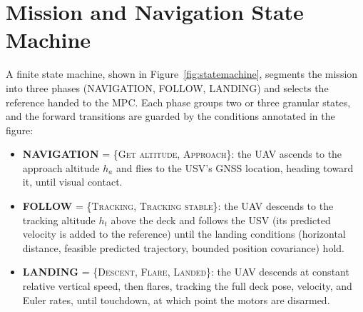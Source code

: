 \documentclass[12pt,a4paper]{report}
\begin{document}
\section{Mission and Navigation State Machine}
A finite state machine, shown in Figure~\ref{fig:statemachine}, segments the mission into three phases (NAVIGATION, FOLLOW, LANDING) and selects the reference handed to the MPC. Each phase groups two or three granular states, and the forward transitions are guarded by the conditions annotated in the figure:

\begin{itemize}[itemsep=2pt]
    \item \textbf{NAVIGATION} = \{\textsc{Get altitude}, \textsc{Approach}\}: the UAV ascends to the approach altitude $h_a$ and flies to the USV's GNSS location, heading toward it, until visual contact.
    \item \textbf{FOLLOW} = \{\textsc{Tracking}, \textsc{Tracking stable}\}: the UAV descends to the tracking altitude $h_t$ above the deck and follows the USV (its predicted velocity is added to the reference) until the landing conditions (horizontal distance, feasible predicted trajectory, bounded position covariance) hold.
    \item \textbf{LANDING} = \{\textsc{Descent}, \textsc{Flare}, \textsc{Landed}\}: the UAV descends at constant relative vertical speed, then flares, tracking the full deck pose, velocity, and Euler rates, until touchdown, at which point the motors are disarmed.
\end{itemize}
\end{document}
